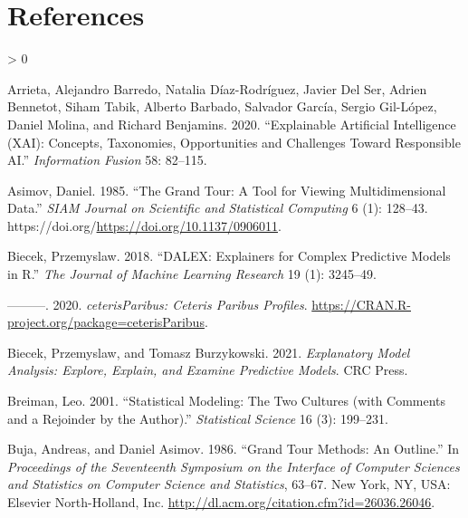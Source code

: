 \documentclass[
]{article}
\newlength{\cslhangindent}
\newenvironment{CSLReferences}[2] %
 {%
  \setlength{\parindent}{0pt}
  \ifodd #1 \everypar{\setlength{\hangindent}{\cslhangindent}}\ignorespaces\fi
  \ifnum #2 > 0
  \setlength{\parskip}{#2\baselineskip}
  \fi
 }%
 {}
\begin{document}
\hypertarget{references}{%
\section*{References}\label{references}}

\hypertarget{refs}{}
\begin{CSLReferences}{1}{0}
\leavevmode\hypertarget{ref-arrieta_explainable_2020}{}%
Arrieta, Alejandro Barredo, Natalia Díaz-Rodríguez, Javier Del Ser, Adrien Bennetot, Siham Tabik, Alberto Barbado, Salvador García, Sergio Gil-López, Daniel Molina, and Richard Benjamins. 2020. {``Explainable {Artificial} {Intelligence} ({XAI}): {Concepts}, Taxonomies, Opportunities and Challenges Toward Responsible {AI}.''} \emph{Information Fusion} 58: 82--115.

\leavevmode\hypertarget{ref-asimov_grand_1985}{}%
Asimov, Daniel. 1985. {``The {Grand} {Tour}: A {Tool} for {Viewing} {Multidimensional} {Data}.''} \emph{SIAM Journal on Scientific and Statistical Computing} 6 (1): 128--43. https://doi.org/\url{https://doi.org/10.1137/0906011}.

\leavevmode\hypertarget{ref-biecek_dalex_2018}{}%
Biecek, Przemyslaw. 2018. {``{DALEX}: Explainers for Complex Predictive Models in {R}.''} \emph{The Journal of Machine Learning Research} 19 (1): 3245--49.

\leavevmode\hypertarget{ref-biecek_ceterisparibus_2020}{}%
---------. 2020. \emph{{ceterisParibus}: {Ceteris} {Paribus} {Profiles}}. \url{https://CRAN.R-project.org/package=ceterisParibus}.

\leavevmode\hypertarget{ref-biecek_explanatory_2021}{}%
Biecek, Przemyslaw, and Tomasz Burzykowski. 2021. \emph{Explanatory {Model} {Analysis}: {Explore}, {Explain}, and {Examine} {Predictive} {Models}}. CRC Press.

\leavevmode\hypertarget{ref-breiman_statistical_2001}{}%
Breiman, Leo. 2001. {``Statistical Modeling: {The} Two Cultures (with Comments and a Rejoinder by the Author).''} \emph{Statistical Science} 16 (3): 199--231.

\leavevmode\hypertarget{ref-buja_grand_1986}{}%
Buja, Andreas, and Daniel Asimov. 1986. {``Grand {Tour} {Methods}: {An} {Outline}.''} In \emph{Proceedings of the {Seventeenth} {Symposium} on the {Interface} of {Computer} {Sciences} and {Statistics} on {Computer} {Science} and {Statistics}}, 63--67. New York, NY, USA: Elsevier North-Holland, Inc. \url{http://dl.acm.org/citation.cfm?id=26036.26046}.


\end{CSLReferences}
\end{document}

